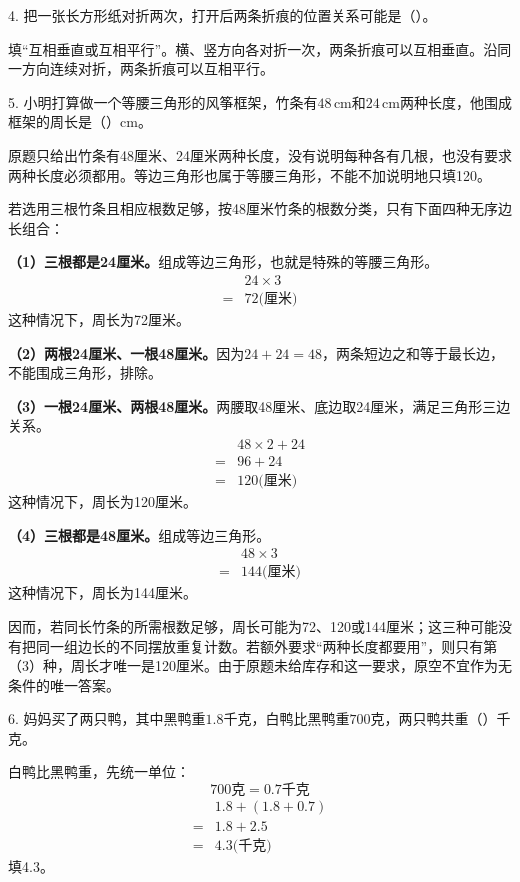4. 把一张长方形纸对折两次，打开后两条折痕的位置关系可能是（\hspace{1.8em}）。\par
\begin{BookAnswer}
填“互相垂直或互相平行”。横、竖方向各对折一次，两条折痕可以互相垂直。沿同一方向连续对折，两条折痕可以互相平行。
\end{BookAnswer}

5. 小明打算做一个等腰三角形的风筝框架，竹条有\(48\,\mathrm{cm}\)和\(24\,\mathrm{cm}\)两种长度，他围成框架的周长是（\hspace{1.8em}）\(\mathrm{cm}\)。\par
\begin{BookAnswer}
原题只给出竹条有48厘米、24厘米两种长度，没有说明每种各有几根，也没有要求两种长度必须都用。等边三角形也属于等腰三角形，不能不加说明地只填120。\par 若选用三根竹条且相应根数足够，按48厘米竹条的根数分类，只有下面四种无序边长组合：\par \textbf{（1）三根都是24厘米。}组成等边三角形，也就是特殊的等腰三角形。\[\begin{aligned}&24\times3\\={}&72\text{(厘米)}\end{aligned}\]这种情况下，周长为72厘米。\par \textbf{（2）两根24厘米、一根48厘米。}因为\(24+24=48\)，两条短边之和等于最长边，不能围成三角形，排除。\par \textbf{（3）一根24厘米、两根48厘米。}两腰取48厘米、底边取24厘米，满足三角形三边关系。\[\begin{aligned}&48\times2+24\\={}&96+24\\={}&120\text{(厘米)}\end{aligned}\]这种情况下，周长为120厘米。\par \textbf{（4）三根都是48厘米。}组成等边三角形。\[\begin{aligned}&48\times3\\={}&144\text{(厘米)}\end{aligned}\]这种情况下，周长为144厘米。\par 因而，若同长竹条的所需根数足够，周长可能为72、120或144厘米；这三种可能没有把同一组边长的不同摆放重复计数。若额外要求“两种长度都要用”，则只有第（3）种，周长才唯一是120厘米。由于原题未给库存和这一要求，原空不宜作为无条件的唯一答案。
\end{BookAnswer}

6. 妈妈买了两只鸭，其中黑鸭重\(1.8\)千克，白鸭比黑鸭重\(700\)克，两只鸭共重（\hspace{1.8em}）千克。\par
\begin{BookAnswer}
白鸭比黑鸭重，先统一单位：\[700\text{克}=0.7\text{千克}\]\[\begin{aligned} &1.8+(1.8+0.7)\\ ={}&1.8+2.5\\ ={}&4.3\text{(千克)}\end{aligned}\]填4.3。
\end{BookAnswer}

